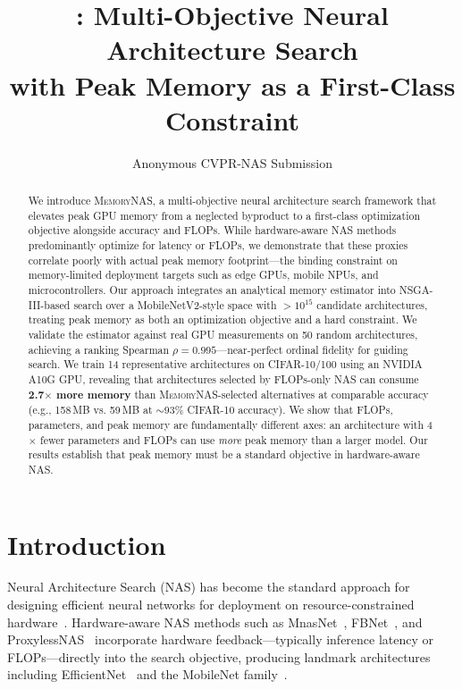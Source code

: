 \documentclass[10pt,twocolumn,letterpaper]{article}
\title{\ours{}: Multi-Objective Neural Architecture Search \\ with Peak Memory as a First-Class Constraint}
\author{
Anonymous CVPR-NAS Submission
}
\newcommand{\ours}{\textsc{MemoryNAS}}
\begin{document}
\maketitle

\begin{abstract}
We introduce \ours{}, a multi-objective neural architecture search framework that elevates peak GPU memory from a neglected byproduct to a first-class optimization objective alongside accuracy and FLOPs. While hardware-aware NAS methods predominantly optimize for latency or FLOPs, we demonstrate that these proxies correlate poorly with actual peak memory footprint---the binding constraint on memory-limited deployment targets such as edge GPUs, mobile NPUs, and microcontrollers. Our approach integrates an analytical memory estimator into NSGA-III-based search over a MobileNetV2-style space with $>10^{15}$ candidate architectures, treating peak memory as both an optimization objective and a hard constraint. We validate the estimator against real GPU measurements on 50 random architectures, achieving a ranking Spearman $\rho = 0.995$---near-perfect ordinal fidelity for guiding search. We train 14 representative architectures on CIFAR-10/100 using an NVIDIA A10G GPU, revealing that architectures selected by FLOPs-only NAS can consume \textbf{2.7$\times$ more memory} than \ours{}-selected alternatives at comparable accuracy (e.g., 158\,MB vs. 59\,MB at $\sim$93\% CIFAR-10 accuracy). We show that FLOPs, parameters, and peak memory are fundamentally different axes: an architecture with 4$\times$ fewer parameters and FLOPs can use \emph{more} peak memory than a larger model. Our results establish that peak memory must be a standard objective in hardware-aware NAS.
\end{abstract}

\section{Introduction}
\label{sec:intro}

Neural Architecture Search (NAS) has become the standard approach for designing efficient neural networks for deployment on resource-constrained hardware~\cite{elsken2019survey, benmeziane2021hwnas}. Hardware-aware NAS methods such as MnasNet~\cite{tan2019mnasnet}, FBNet~\cite{wu2019fbnet}, and ProxylessNAS~\cite{cai2019proxylessnas} incorporate hardware feedback---typically inference latency or FLOPs---directly into the search objective, producing landmark architectures including EfficientNet~\cite{tan2019efficientnet} and the MobileNet family~\cite{howard2017mobilenets, sandler2018mobilenetv2}.
\end{document}
